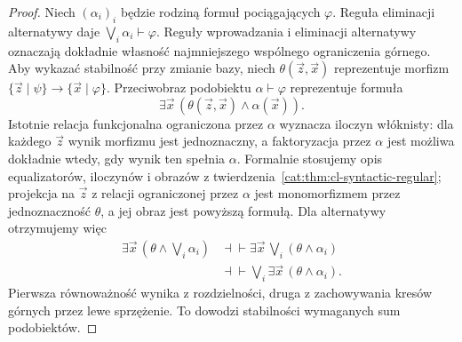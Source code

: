 \begin{proof}
Niech $(\alpha_i)_i$ będzie rodziną formuł pociągających $\varphi$. Reguła eliminacji alternatywy daje $\bigvee_i\alpha_i\vdash\varphi$. Reguły wprowadzania i eliminacji alternatywy oznaczają dokładnie własność najmniejszego wspólnego ograniczenia górnego. Aby wykazać stabilność przy zmianie bazy, niech $\theta(\vec z,\vec x)$ reprezentuje morfizm $\{\vec z\mid\psi\}\to\{\vec x\mid\varphi\}$. Przeciwobraz podobiektu $\alpha\vdash\varphi$ reprezentuje formuła
\[
 \exists\vec x\,(\theta(\vec z,\vec x)\wedge\alpha(\vec x)).
\]
Istotnie relacja funkcjonalna ograniczona przez $\alpha$ wyznacza iloczyn włóknisty: dla każdego $\vec z$ wynik morfizmu jest jednoznaczny, a faktoryzacja przez $\alpha$ jest możliwa dokładnie wtedy, gdy wynik ten spełnia $\alpha$. Formalnie stosujemy opis equalizatorów, iloczynów i obrazów z twierdzenia~\ref{cat:thm:cl-syntactic-regular}; projekcja na $\vec z$ z relacji ograniczonej przez $\alpha$ jest monomorfizmem przez jednoznaczność $\theta$, a jej obraz jest powyższą formułą. Dla alternatywy otrzymujemy więc
\[
\begin{aligned}
 \exists\vec x\,(\theta\wedge\bigvee_i\alpha_i)
 &\dashv\vdash \exists\vec x\,\bigvee_i(\theta\wedge\alpha_i)\\
 &\dashv\vdash \bigvee_i\exists\vec x\,(\theta\wedge\alpha_i).
\end{aligned}
\]
Pierwsza równoważność wynika z rozdzielności, druga z zachowywania kresów górnych przez lewe sprzężenie. To dowodzi stabilności wymaganych sum podobiektów.
\end{proof}

